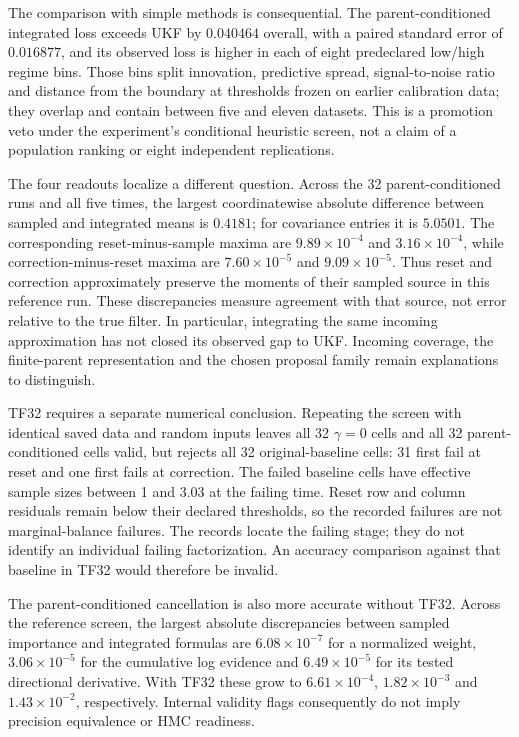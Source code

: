 The comparison with simple methods is consequential. The parent-conditioned
integrated loss exceeds UKF by $0.040464$ overall, with a paired standard
error of $0.016877$, and its observed loss is higher in each of eight
predeclared low/high regime bins. Those bins split innovation, predictive
spread, signal-to-noise ratio and distance from the boundary at thresholds
frozen on earlier calibration data; they overlap and contain between five and
eleven datasets. This is a promotion veto under the experiment's conditional
heuristic screen, not a claim of a population ranking or eight independent
replications.

The four readouts localize a different question. Across the 32
parent-conditioned runs and all five times, the largest coordinatewise
absolute difference between sampled and integrated means is $0.4181$; for
covariance entries it is $5.0501$. The corresponding reset-minus-sample
maxima are $9.89\times10^{-4}$ and $3.16\times10^{-4}$, while
correction-minus-reset maxima are $7.60\times10^{-5}$ and
$9.09\times10^{-5}$. Thus reset and correction approximately preserve the
moments of their sampled source in this reference run. These discrepancies
measure agreement with that source, not error relative to the true filter.
In particular, integrating the same incoming approximation has not closed
its observed gap to UKF. Incoming coverage, the finite-parent representation
and the chosen proposal family remain explanations to distinguish.

TF32 requires a separate numerical conclusion. Repeating the screen with
identical saved data and random inputs leaves all 32 $\gamma=0$ cells and
all 32 parent-conditioned cells valid, but rejects all 32 original-baseline
cells: 31 first fail at reset and one first fails at correction. The failed
baseline cells have effective sample sizes between 1 and 3.03 at the failing
time. Reset row and column residuals remain below their declared thresholds,
so the recorded failures are not marginal-balance failures. The records locate
the failing stage; they do not identify an individual failing factorization.
An accuracy comparison against that baseline in TF32 would therefore be invalid.

The parent-conditioned cancellation is also more accurate without TF32.
Across the reference screen, the largest absolute discrepancies between
sampled importance and integrated formulas are $6.08\times10^{-7}$ for a
normalized weight, $3.06\times10^{-5}$ for the cumulative log evidence and
$6.49\times10^{-5}$ for its tested directional derivative. With TF32 these
grow to $6.61\times10^{-4}$, $1.82\times10^{-3}$ and $1.43\times10^{-2}$,
respectively. Internal validity flags consequently do not imply precision
equivalence or HMC readiness.

